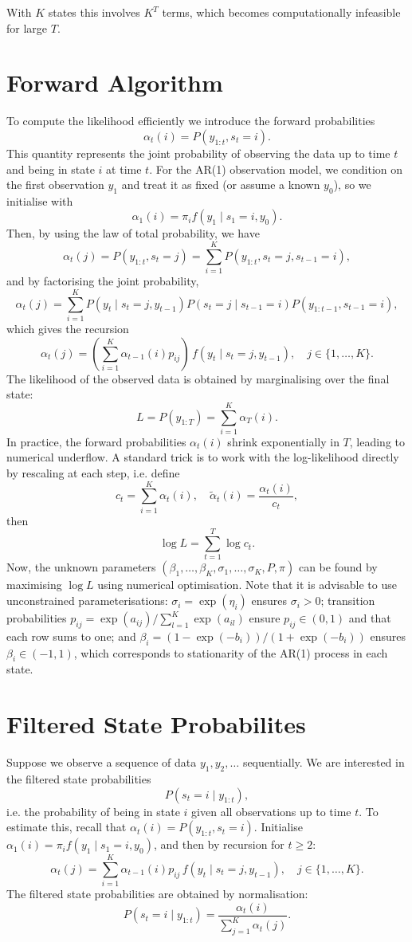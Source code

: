 \documentclass[11pt]{article}
\begin{document}
With $K$ states this involves $K^T$ terms, which becomes computationally infeasible for large $T$.

\section{Forward Algorithm}
To compute the likelihood efficiently we introduce the forward probabilities
$$
\alpha_t(i) = P(y_{1:t}, s_t = i).
$$
This quantity represents the joint probability of observing the data up to time $t$ and being in state $i$ at time $t$. For the AR(1) observation model, we condition on the first observation $y_1$ and treat it as fixed (or assume a known $y_0$), so we initialise with
$$
\alpha_1(i) = \pi_i f(y_1 \mid s_1 = i, y_0).
$$
Then, by using the law of total probability, we have
$$
\alpha_t(j) = P(y_{1:t}, s_t = j) = \sum_{i=1}^K P(y_{1:t}, s_t = j, s_{t-1} = i),
$$
and by factorising the joint probability,
$$
\alpha_t(j) = \sum_{i=1}^K P(y_t \mid s_t = j, y_{t-1}) P(s_t = j \mid s_{t-1} = i) P(y_{1:t-1}, s_{t-1} = i),
$$
which gives the recursion
$$
\alpha_t(j) =\left(\sum_{i=1}^K \alpha_{t-1}(i) p_{ij} \right)\, f(y_t \mid s_t = j, y_{t-1}), \quad j \in \{1, \ldots, K\}.
$$
The likelihood of the observed data is obtained by marginalising over the final state:
$$
L = P(y_{1:T}) = \sum_{i=1}^K \alpha_T(i).
$$
In practice, the forward probabilities $\alpha_t(i)$ shrink exponentially in $T$, leading to numerical underflow. A standard trick is to work with the log-likelihood directly by rescaling at each step, i.e. define
$$
c_t = \sum_{i=1}^K \alpha_t(i), \quad \tilde{\alpha}_t(i) = \frac{\alpha_t(i)}{c_t},
$$
then
$$
\log L = \sum_{t=1}^T \log c_t.
$$
Now, the unknown parameters $(\beta_1, \ldots, \beta_K, \sigma_1, \ldots, \sigma_K, P, \pi)$ 
can be found by maximising $\log L$ using numerical optimisation. 
Note that it is advisable to use unconstrained parameterisations: 
$\sigma_i = \exp(\eta_i)$ ensures $\sigma_i > 0$; transition probabilities 
$p_{ij} = \exp(a_{ij}) / \sum_{l=1}^K \exp(a_{il})$ ensure $p_{ij} \in (0,1)$ 
and that each row sums to one; and $\beta_i = (1 - \exp(-b_i))/(1 + \exp(-b_i))$ 
ensures $\beta_i \in (-1,1)$, which corresponds to stationarity of the AR(1) 
process in each state.

\section{Filtered State Probabilites}
Suppose we observe a sequence of data $y_1, y_2, \ldots$ sequentially. We are interested in the filtered state probabilities
$$
P(s_t = i \mid y_{1:t}),
$$
i.e. the probability of being in state $i$ given all observations up to time $t$. To estimate this, recall that $\alpha_t(i) = P(y_{1:t}, s_t = i)$. Initialise $\alpha_1(i) = \pi_i f(y_1 \mid s_1 = i, y_0)$, and then by recursion for $t \geq 2$:
$$
\alpha_t(j) = \sum_{i=1}^K \alpha_{t-1}(i) p_{ij} \, f(y_t \mid s_t = j, y_{t-1}), \quad j \in \{1, \ldots, K\}.
$$
The filtered state probabilities are obtained by normalisation:
$$
P(s_t = i \mid y_{1:t}) = \frac{\alpha_t(i)}{\sum_{j=1}^K \alpha_t(j)}.
$$
\end{document}
